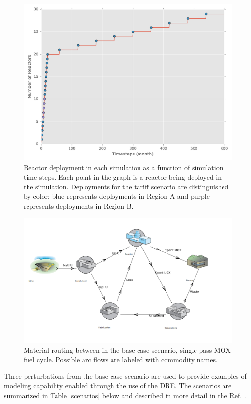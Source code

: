 \begin{figure}
  \begin{center}
    \includegraphics[width=0.75\columnwidth]{rxtr_deploy.pdf}
    \caption[]{
      \label{fig:deploy}
      Reactor deployment in each simulation as a function of simulation time
      steps. Each point in the graph is a reactor being deployed in the
      simulation. Deployments for the tariff scenario are distinguished by
      color: blue represents deployments in Region A and purple represents
      deployments in Region B.}
  \end{center}
\end{figure}

\begin{figure}
  \begin{center}
    \includegraphics[width=0.75\columnwidth]{base_case_fc}
    \caption[]{
      \label{fig:base}
      Material routing between in the base case scenario, single-pass MOX fuel
      cycle. Possible arc flows are labeled with commodity names.}
  \end{center}
\end{figure}

Three perturbations from the base case scenario are used to provide examples of
modeling capability enabled through the use of the DRE. The scenarios are
summarized in Table \ref{scenarios} below and described in more detail in the
Ref. .

